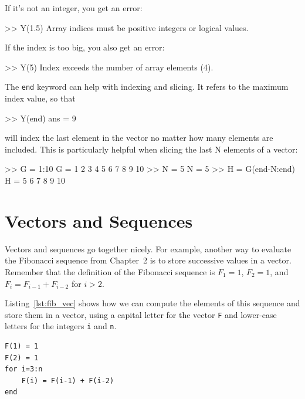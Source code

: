 \documentclass[../../book.tex]{subfiles}
\begin{document}
If it's not an integer, you get an error:

\begin{code}
>> Y(1.5)
Array indices must be positive integers or logical values.
\end{code}

If the index is too big, you also get an error:

\begin{code}
>> Y(5)
Index exceeds the number of array elements (4).
\end{code}

The \lstinline{end} keyword can help with indexing and slicing.  It refers to the maximum index value, so that
\begin{code}
    >> Y(end)
    ans =
         9
\end{code}
will index the last element in the vector no matter how many elements are included.  This is particularly helpful when slicing the last N elements of a vector:
\begin{code}
    >> G = 1:10
    G =
         1     2     3     4     5     6     7     8     9    10
    >> N = 5
    N =
         5
    >> H = G(end-N:end)
    H =
         5     6     7     8     9    10
\end{code}

\section{Vectors and Sequences}
\label{vecseq}


Vectors and sequences go together nicely.
For example, another way to evaluate the Fibonacci sequence from Chapter~2 is to
store successive values in a vector.  Remember that the definition of the
Fibonacci sequence is $F_1 = 1$, $F_2 = 1$, and
$F_{i} = F_{i-1} + F_{i-2}$ for $i > 2$.

Listing~\ref{lst:fib_vec} shows how we can compute the elements of this sequence and store them in a vector, using a capital letter for the vector \lstinline{F}
and lower-case letters for the integers \lstinline{i} and \lstinline{n}.

\begin{lstlisting}[caption={Calculating the Fibonacci sequence using a vector}, label={lst:fib_vec}]
F(1) = 1
F(2) = 1
for i=3:n
    F(i) = F(i-1) + F(i-2)
end
\end{lstlisting}
\end{document}
